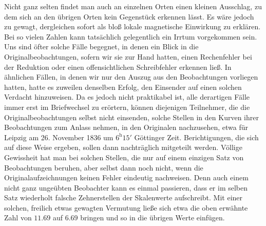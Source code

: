 Nicht ganz selten findet man auch an einzelnen Orten einen kleinen Ausschlag, zu dem sich an den übrigen Orten kein Gegenstück erkennen lässt. Es wäre jedoch zu gewagt, dergleichen sofort als bloß lokale magnetische
Einwirkung zu erklären. Bei so vielen Zahlen kann tatsächlich gelegentlich ein Irrtum vorgekommen sein. Uns sind öfter solche Fälle begegnet, in denen ein Blick in die Originalbeobachtungen, sofern wir sie zur Hand hatten, einen Rechenfehler bei der Reduktion oder einen offensichtlichen Schreibfehler erkennen ließ. In ähnlichen Fällen, in denen wir nur den Auszug aus den Beobachtungen vorliegen hatten, hatte es zuweilen denselben Erfolg, den Einsender auf einen solchen Verdacht hinzuweisen. Da es jedoch nicht praktikabel ist, alle derartigen Fälle immer erst im Briefwechsel zu erörtern, können diejenigen Teilnehmer, die die Originalbeobachtungen selbst nicht einsenden, solche Stellen in den Kurven ihrer Beobachtungen zum Anlass nehmen, in den Originalen nachzusehen, etwa für Leipzig am 26. November 1836 um $6^{\mathrm h}15'$ Göttinger Zeit. Berichtigungen, die sich auf diese Weise ergeben, sollen dann nachträglich mitgeteilt werden. Völlige Gewissheit hat man bei solchen Stellen, die nur auf einem einzigen Satz von Beobachtungen beruhen, aber selbst dann noch nicht, wenn die Originalaufzeichnungen keinen Fehler eindeutig nachweisen. Denn auch einem nicht ganz ungeübten Beobachter kann es einmal passieren, dass er im selben Satz wiederholt falsche Zehnerstellen der Skalenwerte aufschreibt. Mit einer solchen, freilich etwas gewagten Vermutung ließe sich etwa die oben erwähnte Zahl von $11.69$ auf $6.69$ bringen und so in die übrigen Werte einfügen.

